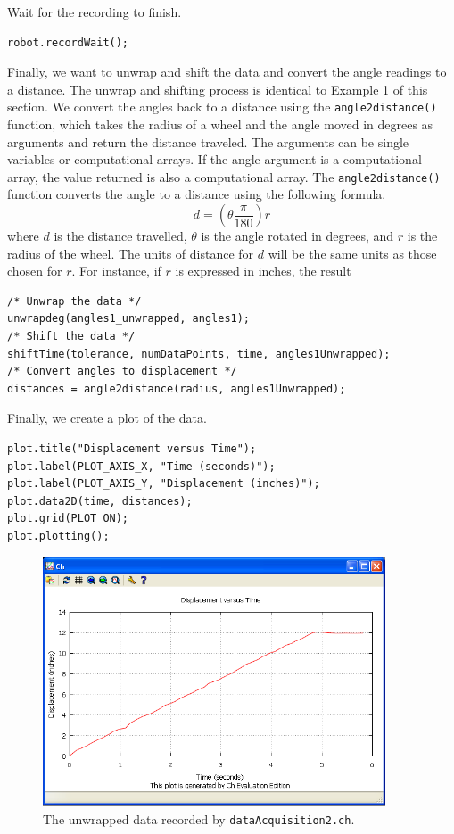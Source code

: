 \documentclass{article}
\begin{document}
Wait for the recording to finish.
\begin{verbatim}
robot.recordWait();
\end{verbatim}

Finally, we want to unwrap and shift the data and convert the angle readings to a distance.
The unwrap and shifting process is identical to Example 1 of this section. 
We convert the angles back to a distance using the \texttt{angle2distance()} function,
which takes the radius of a wheel and the angle moved in degrees as arguments and
return the distance traveled. The arguments can be single variables or computational
arrays. If the angle argument is a computational array, the value returned is also
a computational array. The \texttt{angle2distance()} function converts the angle
to a distance using the following formula.
\begin{equation*}
d = \left(\theta \frac{\pi}{180}\right) r
\end{equation*}
where $d$ is the distance travelled, $\theta$ is the angle rotated in degrees, and $r$ is the
radius of the wheel. The units of distance for $d$ will be the same units as those
chosen for $r$. For instance, if $r$ is expressed in inches, the result 

\begin{verbatim}
/* Unwrap the data */
unwrapdeg(angles1_unwrapped, angles1);
/* Shift the data */
shiftTime(tolerance, numDataPoints, time, angles1Unwrapped);
/* Convert angles to displacement */
distances = angle2distance(radius, angles1Unwrapped);
\end{verbatim}

Finally, we create a plot of the data.
\begin{verbatim}
plot.title("Displacement versus Time");
plot.label(PLOT_AXIS_X, "Time (seconds)");
plot.label(PLOT_AXIS_Y, "Displacement (inches)");
plot.data2D(time, distances);
plot.grid(PLOT_ON);
plot.plotting();
\end{verbatim}

\begin{figure}[H]
\centering
\includegraphics[width=4in]{images/dataacq3_plot1.png}
\caption{\label{fig:dataacq3_fig1} The unwrapped data recorded by \texttt{dataAcquisition2.ch}.}
\end{figure}
\end{document}
